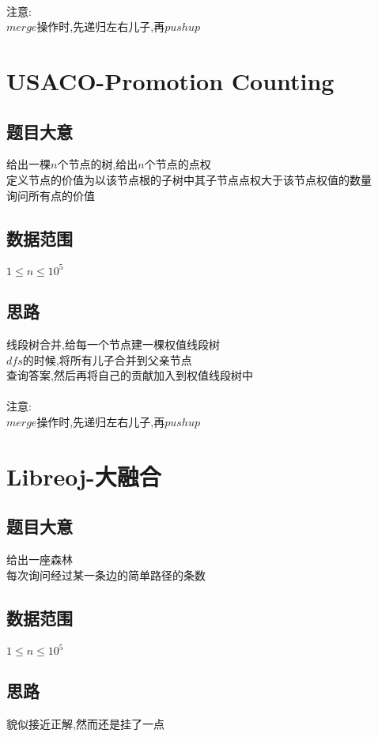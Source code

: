 \documentclass{ctexart}
\numberwithin{equation}{section}
\begin{document}
\begin{flushleft}
  ~\\
  注意:\\
  $merge$操作时,先递归左右儿子,再$pushup$\\
  \newpage

  \section{USACO-Promotion Counting}
  \subsection{题目大意}
  给出一棵$n$个节点的树,给出$n$个节点的点权\\
  定义节点的价值为以该节点根的子树中其子节点点权大于该节点权值的数量\\
  询问所有点的价值\\
  \subsection{数据范围}
  $1\le n\le 10^5$\\
  \subsection{思路}
  线段树合并,给每一个节点建一棵权值线段树\\
  $dfs$的时候,将所有儿子合并到父亲节点\\
  查询答案,然后再将自己的贡献加入到权值线段树中\\

  ~\\
  注意:\\
  $merge$操作时,先递归左右儿子,再$pushup$\\
  \newpage

  \section{Libreoj-大融合}
  \subsection{题目大意}
  给出一座森林\\
  每次询问经过某一条边的简单路径的条数\\
  \subsection{数据范围}
  $1\le n\le 10^5$\\
  \subsection{思路}
  貌似接近正解,然而还是挂了一点\\


\end{flushleft}
\end{document}
